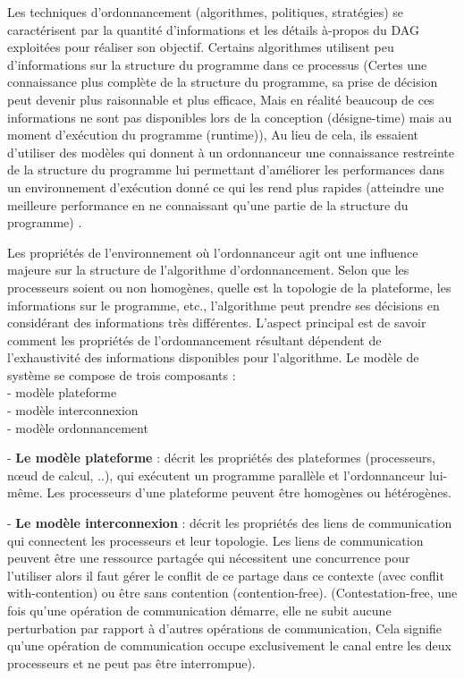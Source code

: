 %
Les techniques d'ordonnancement (algorithmes, politiques, stratégies) se caractérisent par la quantité d'informations et les détails à-propos du DAG exploitées pour réaliser son objectif.
Certains algorithmes utilisent peu d'informations sur la structure du programme dans ce processus 
(Certes une connaissance plus complète de la structure du programme, sa prise de décision peut devenir plus raisonnable et plus efficace, 
Mais en réalité beaucoup de ces informations ne sont pas disponibles lors de la conception (désigne-time) mais au moment d'exécution du programme (runtime)),  
Au lieu de cela, ils essaient d'utiliser des modèles qui donnent à un ordonnanceur une connaissance restreinte de la structure du programme lui permettant d'améliorer les performances dans un environnement d'exécution donné ce qui les rend plus rapides (atteindre une meilleure performance en ne connaissant qu'une partie de la structure du programme) \cite{HL14}.

Les propriétés de l'environnement où l'ordonnanceur agit ont une influence majeure sur la structure de l'algorithme d’ordonnancement. 
Selon que les processeurs soient ou non homogènes, quelle est la topologie de la plateforme, les informations sur le programme, etc., l'algorithme peut prendre ses décisions en considérant des informations très différentes. 
L'aspect principal est de savoir comment les propriétés de l'ordonnancement résultant dépendent de l'exhaustivité des informations disponibles pour l'algorithme. Le modèle de système se compose de trois composants : \\
%
- modèle plateforme\\
- modèle interconnexion\\
- modèle ordonnancement 

- \textbf{Le modèle plateforme} : décrit les propriétés des plateformes (processeurs, nœud de calcul,  ..), qui exécutent un programme parallèle et l’ordonnanceur lui-même. 
Les processeurs d'une plateforme peuvent être homogènes ou hétérogènes. 

- \textbf{Le modèle interconnexion} : décrit les propriétés des liens de communication qui connectent les processeurs et leur topologie.
Les liens de communication peuvent être une ressource partagée qui nécessitent une concurrence pour l'utiliser alors il faut gérer le conflit de ce partage dans ce contexte (avec conflit with-contention) ou être sans contention (contention-free). 
%
(Contestation-free, une fois qu'une opération de communication démarre, elle ne subit aucune perturbation par rapport à d'autres opérations de communication,
Cela signifie qu'une opération de communication occupe exclusivement le canal entre les deux processeurs et ne peut pas être interrompue). 

